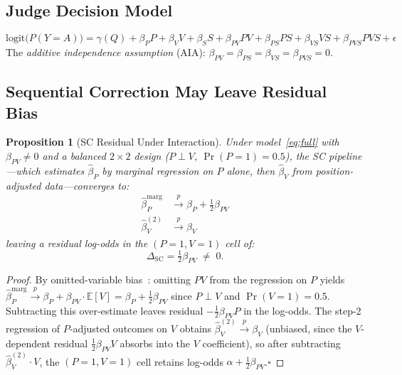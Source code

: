 \documentclass[10pt,conference]{IEEEtran}
\newtheorem{proposition}{Proposition}
\newcommand{\logit}{\mathrm{logit}}
\begin{document}
\subsection{Judge Decision Model}

\begin{equation}
  \logit\!\bigl(P(Y{=}A)\bigr)
  = \gamma(Q) + \beta_P P + \beta_V V + \beta_S S
  + \beta_{PV}PV + \beta_{PS}PS + \beta_{VS}VS
  + \beta_{PVS}PVS + \epsilon
  \label{eq:full}
\end{equation}
The \textit{additive independence assumption} (AIA):
$\beta_{PV}{=}\beta_{PS}{=}\beta_{VS}{=}\beta_{PVS}{=}0$.

\subsection{Sequential Correction May Leave Residual Bias}

\begin{proposition}[SC Residual Under Interaction]
\label{prop:residual}
Under model~\eqref{eq:full} with $\beta_{PV}{\neq}0$ and
a balanced $2{\times}2$ design
($P{\perp}V$, $\Pr(P{=}1){=}0.5$), the SC pipeline---which
estimates $\hat\beta_P$ by marginal regression on $P$ alone,
then $\hat\beta_V$ from position-adjusted data---converges to:
\begin{align}
  \hat\beta_P^{\text{marg}}
    &\xrightarrow{p} \beta_P + \tfrac{1}{2}\beta_{PV}
    \label{eq:marg}\\
  \hat\beta_V^{(2)}
    &\xrightarrow{p} \beta_V
    \label{eq:v}
\end{align}
leaving a residual log-odds in the $(P{=}1, V{=}1)$ cell of:
\begin{equation}
  \Delta_\text{SC} = \tfrac{1}{2}\beta_{PV} \;\neq\; 0.
  \label{eq:delta}
\end{equation}
\end{proposition}

\begin{proof}
By omitted-variable bias~\cite{angrist2009}: omitting $PV$
from the regression on $P$ yields
$\hat\beta_P^{\text{marg}} \xrightarrow{p}
\beta_P + \beta_{PV}\cdot\mathbb{E}[V] =
\beta_P + \tfrac{1}{2}\beta_{PV}$
since $P\perp V$ and $\Pr(V{=}1){=}0.5$.
Subtracting this over-estimate leaves residual
$-\tfrac{1}{2}\beta_{PV}P$ in the log-odds.
The step-2 regression of $P$-adjusted outcomes on $V$ obtains
$\hat\beta_V^{(2)}\xrightarrow{p}\beta_V$ (unbiased, since
the $V$-dependent residual $\tfrac{1}{2}\beta_{PV}V$ absorbs
into the $V$ coefficient), so after subtracting
$\hat\beta_V^{(2)}\cdot V$, the $(P{=}1,V{=}1)$ cell retains
log-odds $\alpha + \tfrac{1}{2}\beta_{PV}$.\hfill$\square$
\end{proof}
\end{document}

